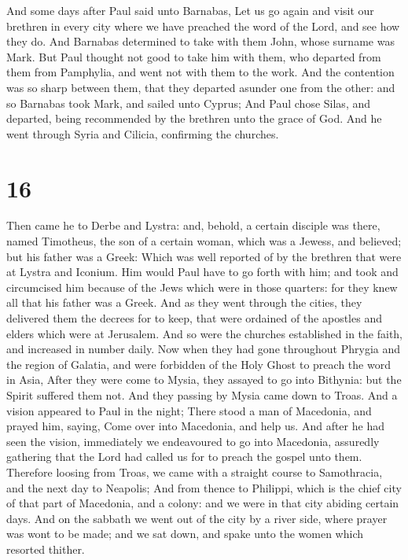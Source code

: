  And some days after Paul said unto Barnabas, Let us go
again and visit our brethren in every city where we have preached the
word of the Lord, and see how they do.  And Barnabas
determined to take with them John, whose surname was Mark. 
But Paul thought not good to take him with them, who departed from them
from Pamphylia, and went not with them to the work.  And
the contention was so sharp between them, that they departed asunder one
from the other: and so Barnabas took Mark, and sailed unto Cyprus;
 And Paul chose Silas, and departed, being recommended by
the brethren unto the grace of God.  And he went through
Syria and Cilicia, confirming the churches.

\hypertarget{section-15}{%
\section{16}\label{section-15}}

 Then came he to Derbe and Lystra: and, behold, a certain
disciple was there, named Timotheus, the son of a certain woman, which
was a Jewess, and believed; but his father was a Greek: 
Which was well reported of by the brethren that were at Lystra and
Iconium.  Him would Paul have to go forth with him; and took
and circumcised him because of the Jews which were in those quarters:
for they knew all that his father was a Greek.  And as they
went through the cities, they delivered them the decrees for to keep,
that were ordained of the apostles and elders which were at Jerusalem.
 And so were the churches established in the faith, and
increased in number daily.  Now when they had gone
throughout Phrygia and the region of Galatia, and were forbidden of the
Holy Ghost to preach the word in Asia,  After they were come
to Mysia, they assayed to go into Bithynia: but the Spirit suffered them
not.  And they passing by Mysia came down to Troas.
 And a vision appeared to Paul in the night; There stood a
man of Macedonia, and prayed him, saying, Come over into Macedonia, and
help us.  And after he had seen the vision, immediately we
endeavoured to go into Macedonia, assuredly gathering that the Lord had
called us for to preach the gospel unto them.  Therefore
loosing from Troas, we came with a straight course to Samothracia, and
the next day to Neapolis;  And from thence to Philippi,
which is the chief city of that part of Macedonia, and a colony: and we
were in that city abiding certain days.  And on the sabbath
we went out of the city by a river side, where prayer was wont to be
made; and we sat down, and spake unto the women which resorted thither.

